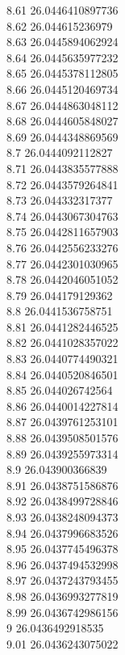 {8.61	26.0446410897736\\
8.62	26.044615236979\\
8.63	26.0445894062924\\
8.64	26.0445635977232\\
8.65	26.0445378112805\\
8.66	26.0445120469734\\
8.67	26.0444863048112\\
8.68	26.0444605848027\\
8.69	26.0444348869569\\
8.7	26.0444092112827\\
8.71	26.0443835577888\\
8.72	26.0443579264841\\
8.73	26.044332317377\\
8.74	26.0443067304763\\
8.75	26.0442811657903\\
8.76	26.0442556233276\\
8.77	26.0442301030965\\
8.78	26.0442046051052\\
8.79	26.044179129362\\
8.8	26.0441536758751\\
8.81	26.0441282446525\\
8.82	26.0441028357022\\
8.83	26.0440774490321\\
8.84	26.0440520846501\\
8.85	26.044026742564\\
8.86	26.0440014227814\\
8.87	26.0439761253101\\
8.88	26.0439508501576\\
8.89	26.0439255973314\\
8.9	26.043900366839\\
8.91	26.0438751586876\\
8.92	26.0438499728846\\
8.93	26.0438248094373\\
8.94	26.0437996683526\\
8.95	26.0437745496378\\
8.96	26.0437494532998\\
8.97	26.0437243793455\\
8.98	26.0436993277819\\
8.99	26.0436742986156\\
9	26.0436492918535\\
9.01	26.0436243075022\\
}
